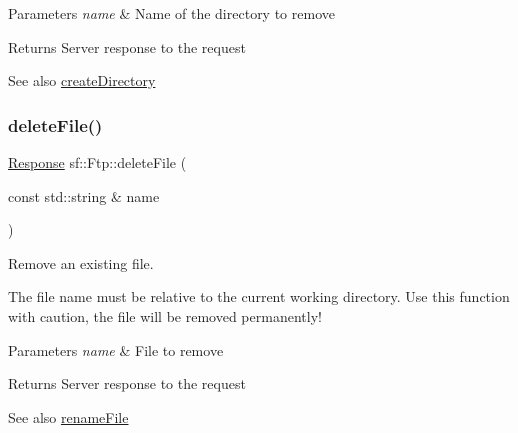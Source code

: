 \begin{DoxyParams}{Parameters}
{\em name} & Name of the directory to remove\\
\hline
\end{DoxyParams}
\begin{DoxyReturn}{Returns}
Server response to the request
\end{DoxyReturn}
\begin{DoxySeeAlso}{See also}
\mbox{\hyperlink{classsf_1_1_ftp_a247b84c4b25da37804218c2b748c4787}{create\+Directory}} \begin{DoxyVerb}\end{DoxyVerb}
 
\end{DoxySeeAlso}
\mbox{\label{classsf_1_1_ftp_a8aa272b0eb7769a850006e70fcad370f}} 
\subsubsection{\texorpdfstring{deleteFile()}{deleteFile()}}
{\footnotesize\ttfamily \mbox{\hyperlink{classsf_1_1_ftp_1_1_response}{Response}} sf\+::\+Ftp\+::delete\+File (\begin{DoxyParamCaption}\item[{const std\+::string \&}]{name }\end{DoxyParamCaption})}



Remove an existing file. 

The file name must be relative to the current working directory. Use this function with caution, the file will be removed permanently!


\begin{DoxyParams}{Parameters}
{\em name} & File to remove\\
\hline
\end{DoxyParams}
\begin{DoxyReturn}{Returns}
Server response to the request
\end{DoxyReturn}
\begin{DoxySeeAlso}{See also}
\mbox{\hyperlink{classsf_1_1_ftp_a8f99251d7153e1dc26723e4006deb764}{rename\+File}} \begin{DoxyVerb}\end{DoxyVerb}
 
\end{DoxySeeAlso}
\mbox{\label{classsf_1_1_ftp_acf7459926f3391cd06bf84337ed6a0f4}} 
